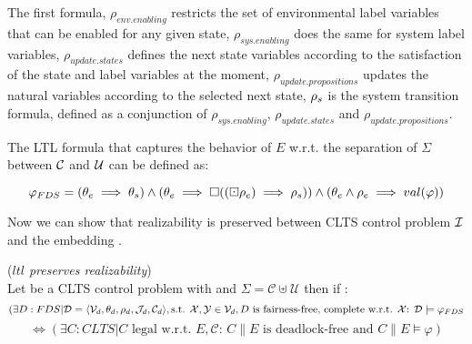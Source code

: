 The first formula, $\rho_{env.enabling}$ restricts the set of environmental label variables that can be enabled for any given state, $\rho_{sys.enabling}$ does the same for system label variables, $\rho_{update.states}$ defines the next state variables according to the satisfaction of the state and label variables at the moment, $\rho_{update.propositions}$ updates the natural variables according to the selected next state, ${\rho_s}$ is the system transition formula, defined as a conjunction of $\rho_{sys.enabling}$, $\rho_{update.states}$ and $\rho_{update.propositions}$.
%
%


The LTL formula that captures the behavior of $E$ w.r.t. the separation of $\Sigma$ between $\mathcal{C}$ and $\mathcal{U}$ can be defined as:

\[ \varphi_{FDS} = (\theta_e \implies \theta_s) \wedge (\theta_e \implies \square((\boxdot \rho_e) \implies \rho_s)) \wedge (\theta_e \wedge \rho_e \implies val(\varphi)) \]

Now we can show that realizability is preserved between CLTS control problem $\mathcal{I}$ and the embedding \fdsEmbedding.

\begin{theorem}(\emph{$ltl$ preserves realizability})\label{theorem:gs_preserves_realizability}\\
	Let \controlProblemDef be a CLTS control problem with  and $\Sigma = \mathcal{C}\uplus \mathcal{U}$ then if \fdsEmbeddingDef:
	\small
	\[(\exists D:FDS|\mathcal{D}= \langle \mathcal{V}_d, \theta_d, \rho_d, \mathcal{J}_d, \mathcal{C}_d\rangle, \text{s.t. }    {\mathcal{X}}, {\mathcal{Y}} \in \mathcal{V}_d, D \text{ is fairness-free, complete w.r.t. } {\mathcal{X}} \text{: } \mathcal{D} \models \varphi_{FDS}\]
	 \[ \iff (\exists C:CLTS| C \text{ legal w.r.t. } E,\mathcal{C} \text{: } C \parallel E \text{ is deadlock-free and } C \parallel E \models \varphi)  \]
	\normalsize
\end{theorem}

